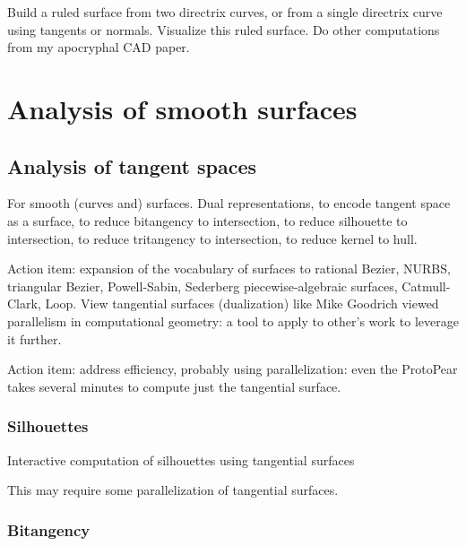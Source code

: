 \documentclass[11pt]{article}
\begin{document}
Build a ruled surface from two directrix curves, or from a single directrix curve
using tangents or normals.
Visualize this ruled surface.
Do other computations from my apocryphal CAD paper.


\section{Analysis of smooth surfaces}

\subsection{Analysis of tangent spaces}

For smooth (curves and) surfaces.
Dual representations, to encode tangent space as a surface,
to reduce bitangency to intersection, to reduce silhouette to intersection, 
to reduce tritangency to intersection, to reduce kernel to hull.

Action item: expansion of the vocabulary of surfaces to rational Bezier, NURBS,
triangular Bezier,
Powell-Sabin, Sederberg piecewise-algebraic surfaces, Catmull-Clark, Loop.
View tangential surfaces (dualization) like Mike Goodrich viewed parallelism in
computational geometry: a tool to apply to other's work to leverage it further.

Action item: address efficiency, probably using parallelization: 
even the ProtoPear takes several minutes to compute just the tangential surface.


\subsubsection{Silhouettes}

Interactive computation of silhouettes using tangential surfaces

This may require some parallelization of tangential surfaces.


\subsubsection{Bitangency}
\end{document}

